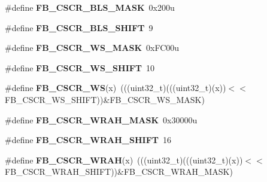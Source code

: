 \begin{DoxyCompactItemize}
\item 
\#define {\bfseries F\+B\+\_\+\+C\+S\+C\+R\+\_\+\+B\+L\+S\+\_\+\+M\+A\+SK}~0x200u\hypertarget{group__FB__Register__Masks_gac8f4e3d4dba2c5e902c51e82cd870d9f}{}\label{group__FB__Register__Masks_gac8f4e3d4dba2c5e902c51e82cd870d9f}

\item 
\#define {\bfseries F\+B\+\_\+\+C\+S\+C\+R\+\_\+\+B\+L\+S\+\_\+\+S\+H\+I\+FT}~9\hypertarget{group__FB__Register__Masks_gabbdaea319c238ce8fc0ba6d79e29b411}{}\label{group__FB__Register__Masks_gabbdaea319c238ce8fc0ba6d79e29b411}

\item 
\#define {\bfseries F\+B\+\_\+\+C\+S\+C\+R\+\_\+\+W\+S\+\_\+\+M\+A\+SK}~0x\+F\+C00u\hypertarget{group__FB__Register__Masks_gaf6ddd3e9e267951e4af3886b8bf0c54e}{}\label{group__FB__Register__Masks_gaf6ddd3e9e267951e4af3886b8bf0c54e}

\item 
\#define {\bfseries F\+B\+\_\+\+C\+S\+C\+R\+\_\+\+W\+S\+\_\+\+S\+H\+I\+FT}~10\hypertarget{group__FB__Register__Masks_ga32c1c45a903fe04d1a3ffc5c2f95254f}{}\label{group__FB__Register__Masks_ga32c1c45a903fe04d1a3ffc5c2f95254f}

\item 
\#define {\bfseries F\+B\+\_\+\+C\+S\+C\+R\+\_\+\+WS}(x)~(((uint32\+\_\+t)(((uint32\+\_\+t)(x))$<$$<$F\+B\+\_\+\+C\+S\+C\+R\+\_\+\+W\+S\+\_\+\+S\+H\+I\+FT))\&F\+B\+\_\+\+C\+S\+C\+R\+\_\+\+W\+S\+\_\+\+M\+A\+SK)\hypertarget{group__FB__Register__Masks_ga1841831455a8eb60266de1720338fca6}{}\label{group__FB__Register__Masks_ga1841831455a8eb60266de1720338fca6}

\item 
\#define {\bfseries F\+B\+\_\+\+C\+S\+C\+R\+\_\+\+W\+R\+A\+H\+\_\+\+M\+A\+SK}~0x30000u\hypertarget{group__FB__Register__Masks_ga2843fc1784996e04d8a936a38da538af}{}\label{group__FB__Register__Masks_ga2843fc1784996e04d8a936a38da538af}

\item 
\#define {\bfseries F\+B\+\_\+\+C\+S\+C\+R\+\_\+\+W\+R\+A\+H\+\_\+\+S\+H\+I\+FT}~16\hypertarget{group__FB__Register__Masks_gac68c032af50701cb3bbc1f1448b5ba2c}{}\label{group__FB__Register__Masks_gac68c032af50701cb3bbc1f1448b5ba2c}

\item 
\#define {\bfseries F\+B\+\_\+\+C\+S\+C\+R\+\_\+\+W\+R\+AH}(x)~(((uint32\+\_\+t)(((uint32\+\_\+t)(x))$<$$<$F\+B\+\_\+\+C\+S\+C\+R\+\_\+\+W\+R\+A\+H\+\_\+\+S\+H\+I\+FT))\&F\+B\+\_\+\+C\+S\+C\+R\+\_\+\+W\+R\+A\+H\+\_\+\+M\+A\+SK)\hypertarget{group__FB__Register__Masks_gaa98e7dddfbb686316efe80b91c74f4ef}{}\label{group__FB__Register__Masks_gaa98e7dddfbb686316efe80b91c74f4ef}


\end{DoxyCompactItemize}

